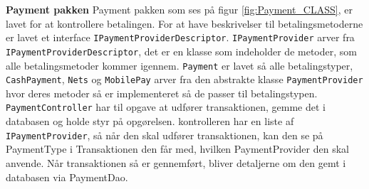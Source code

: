 \textbf{Payment pakken}
\newline
Payment pakken som ses på figur \ref{fig:Payment_CLASS}, er lavet for at kontrollere betalingen. For at have beskrivelser til betalingsmetoderne  er lavet et interface \texttt{IPaymentProviderDescriptor}. \texttt{IPaymentProvider} arver fra \texttt{IPaymentProviderDescriptor}, det er en klasse som indeholder de metoder, som alle betalingsmetoder kommer igennem. \texttt{Payment} er lavet så alle betalingstyper, \texttt{CashPayment}, \texttt{Nets} og \texttt{MobilePay} arver fra den abstrakte klasse \texttt{PaymentProvider} hvor deres metoder så er implementeret så de passer til betalingstypen. 
\newline
\newline
\texttt{PaymentController} har til opgave at udfører transaktionen, gemme det i databasen og holde styr på opgørelsen. kontrolleren har en liste af \texttt{IPaymentProvider}, så når den skal udfører transaktionen, kan den se på PaymentType i Transaktionen den får med, hvilken PaymentProvider den skal anvende. Når transaktionen så er gennemført, bliver detaljerne om den gemt i databasen via PaymentDao. 

